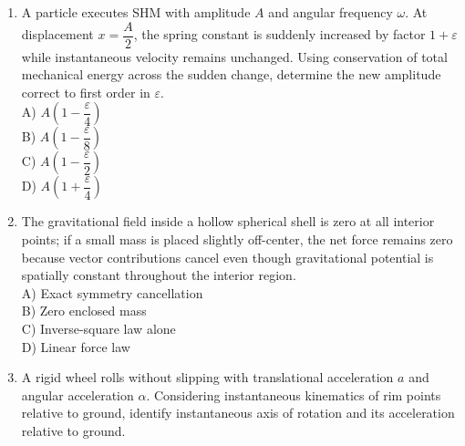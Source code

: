 \documentclass[12pt]{article}
\begin{document}
\begin{enumerate}
\begin{center}
\begin{tikzpicture}[scale=1]
\end{tikzpicture}
\end{center}

A) \(\dfrac{R+r}{r}\omega\)\\

B) \(\dfrac{R}{r}\omega\)\\

C) \(\dfrac{R}{R+r}\omega\)\\

D) \(\dfrac{r}{R}\omega\)

\item A particle executes SHM with amplitude \(A\) and angular frequency \(\omega\). At displacement \(x=\dfrac{A}{2}\), the spring constant is suddenly increased by factor \(1+\varepsilon\) while instantaneous velocity remains unchanged. Using conservation of total mechanical energy across the sudden change, determine the new amplitude correct to first order in \(\varepsilon\).\\

A) \(A\left(1-\dfrac{\varepsilon}{4}\right)\)\\

B) \(A\left(1-\dfrac{\varepsilon}{8}\right)\)\\

C) \(A\left(1-\dfrac{\varepsilon}{2}\right)\)\\

D) \(A\left(1+\dfrac{\varepsilon}{4}\right)\)

\item The gravitational field inside a hollow spherical shell is zero at all interior points; if a small mass is placed slightly off-center, the net force remains zero because vector contributions cancel even though gravitational potential is spatially constant throughout the interior region.\\

A) Exact symmetry cancellation\\

B) Zero enclosed mass\\

C) Inverse-square law alone\\

D) Linear force law

\item A rigid wheel rolls without slipping with translational acceleration \(a\) and angular acceleration \(\alpha\). Considering instantaneous kinematics of rim points relative to ground, identify instantaneous axis of rotation and its acceleration relative to ground.\\


\end{enumerate}
\end{document}
